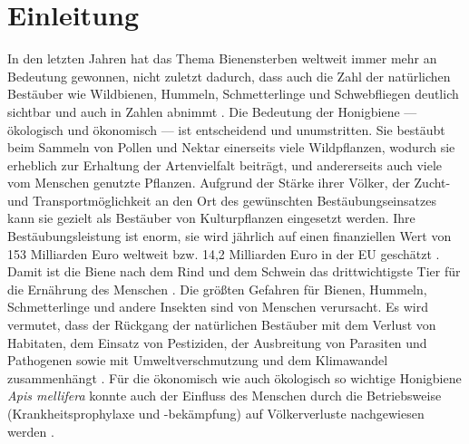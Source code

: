 \section{Einleitung}

In den letzten Jahren hat das Thema Bienensterben weltweit immer mehr an Bedeutung gewonnen, nicht zuletzt dadurch, dass auch die Zahl der natürlichen Bestäuber wie Wildbienen, Hummeln, Schmetterlinge und Schwebfliegen deutlich sichtbar und auch in Zahlen abnimmt \citep{hallmann2017}. Die Bedeutung der Honigbiene --- ökologisch und ökonomisch --- ist entscheidend und unumstritten. Sie bestäubt beim Sammeln von Pollen und Nektar einerseits viele Wildpflanzen, wodurch sie erheblich zur Erhaltung der Artenvielfalt beiträgt, und andererseits auch viele vom Menschen genutzte Pflanzen. Aufgrund der Stärke ihrer Völker, der Zucht- und Transportmöglichkeit an den Ort des gewünschten Bestäubungseinsatzes kann sie gezielt als Bestäuber von Kulturpflanzen eingesetzt werden. Ihre Bestäubungsleistung ist enorm, sie wird jährlich auf einen finanziellen Wert von 153 Milliarden Euro weltweit bzw. 14,2 Milliarden Euro in der EU geschätzt \citep{gallai2009}. Damit ist die Biene nach dem Rind und dem Schwein das drittwichtigste Tier für die Ernährung des Menschen \citep{kearns1998}.
\newline
Die größten Gefahren für Bienen, Hummeln, Schmetterlinge und andere Insekten sind von Menschen verursacht. Es wird vermutet, dass der Rückgang der natürlichen Bestäuber mit dem Verlust von Habitaten, dem Einsatz von Pestiziden, der Ausbreitung von Parasiten und Pathogenen sowie mit Umweltverschmutzung und dem Klimawandel zusammenhängt \citep{biesmeijer2006, cameron2011, vanengelsdorp2011, cornman2012, goulson2013, steinhauer2014, steinhauer2018, vanderzee2014, clermont2015, clermont2015, woodcock2016, belsky2019}. Für die ökonomisch wie auch ökologisch so wichtige Honigbiene \textit{Apis mellifera} konnte auch der Einfluss des Menschen durch die Betriebsweise (Krankheitsprophylaxe und -bekämpfung) auf Völkerverluste nachgewiesen werden \citep{jacques2017}.
\newline
